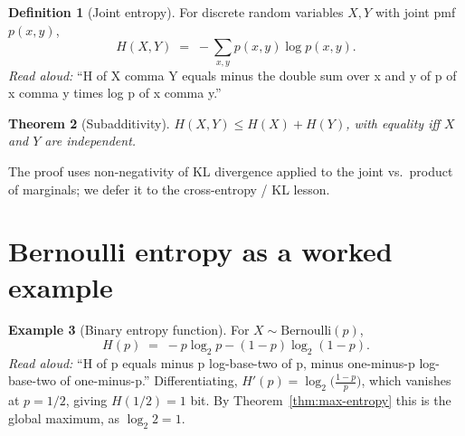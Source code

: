 \documentclass[11pt]{article}
\newtheorem{theorem}{Theorem}
\theoremstyle{definition}
\newtheorem{definition}[theorem]{Definition}
\newtheorem{example}[theorem]{Example}
\begin{document}
\begin{definition}[Joint entropy]
For discrete random variables $X, Y$ with joint pmf $p(x, y)$,
\[
H(X, Y) \;=\; -\sum_{x, y} p(x, y) \log p(x, y).
\]
\emph{Read aloud:} ``H of X comma Y equals minus the double sum over x and y of p of x comma y times log p of x comma y.''
\end{definition}

\begin{theorem}[Subadditivity]
$H(X, Y) \le H(X) + H(Y)$, with equality iff $X$ and $Y$ are independent.
\end{theorem}

The proof uses non-negativity of KL divergence applied to the joint vs.\ product of
marginals; we defer it to the cross-entropy / KL lesson.

\section{Bernoulli entropy as a worked example}

\begin{example}[Binary entropy function]
For $X \sim \mathrm{Bernoulli}(p)$,
\[
H(p) \;=\; -p \log_2 p - (1-p) \log_2 (1-p).
\]
\emph{Read aloud:} ``H of p equals minus p log-base-two of p, minus one-minus-p log-base-two of one-minus-p.''
Differentiating, $H'(p) = \log_2\!\big(\tfrac{1-p}{p}\big)$, which vanishes at $p = 1/2$,
giving $H(1/2) = 1$ bit. By Theorem~\ref{thm:max-entropy} this is the global maximum, as
$\log_2 2 = 1$.
\end{example}
\end{document}
